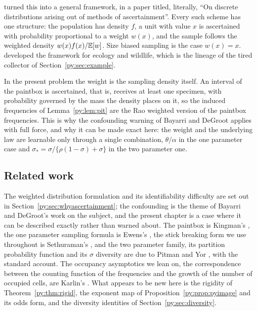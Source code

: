 \citet{py:rao1965} turned this into a general framework, in a paper titled, literally, ``On discrete
distributions arising out of methods of ascertainment''. Every such scheme has one structure: the
population has density $f$, a unit with value $x$ is ascertained with probability proportional to a
weight $w(x)$, and the sample follows the weighted density $w(x)f(x)/\mathbb{E}[w]$. Size biased sampling
is the case $w(x) = x$. \citet{py:patil1978} developed the framework for ecology and wildlife, which
is the lineage of the tired collector of Section~\ref{py:sec:example}.

In the present problem the weight is the sampling density itself. An interval of the paintbox is
ascertained, that is, receives at least one specimen, with probability governed by the mass the
density places on it, so the induced frequencies of Lemma~\ref{py:lem:pit} are the Rao weighted version
of the paintbox frequencies. This is why the confounding warning of Bayarri and DeGroot applies with
full force, and why it can be made exact here: the weight and the underlying law are learnable only
through a single combination, $\theta/\alpha$ in the one parameter case and
$\sigma_* = \sigma/\{\rho(1-\sigma)+\sigma\}$ in the two parameter one.

\subsection{Related work}

The weighted distribution formulation and its identifiability difficulty are set out in
Section~\ref{py:sec:whyascertainment}; the confounding is the theme of Bayarri and DeGroot's work on
the subject, and the present chapter is a case where it can be described exactly rather than warned
about. The paintbox is Kingman's \citep{py:kingman1978}, the one parameter sampling formula is Ewens's
\citep{py:ewens1972}, the stick breaking form we use throughout is Sethuraman's
\citep{py:sethuraman1994}, and the two parameter family, its partition probability function and
its $\sigma$ diversity are due to Pitman and Yor \citep{py:pitman1995,py:pitmanyor1997}, with
\citet{py:pitman2006} the standard account. The occupancy asymptotics we lean on, the
correspondence between the counting function of the frequencies and the growth of the number of
occupied cells, are Karlin's \citep{py:karlin1967}. What appears to be new here is the rigidity of Theorem~\ref{py:thm:rigid},
the exponent map of Proposition~\ref{py:prop:pyimage} and its odds form, and the diversity identities of
Section~\ref{py:sec:diversity}.

